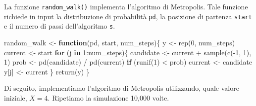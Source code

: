 \documentclass[
]{memoir}
\newenvironment{Shaded}{\begin{snugshade}}{\end{snugshade}}
\newcommand{\AttributeTok}[1]{\textcolor[rgb]{0.77,0.63,0.00}{#1}}
\newcommand{\ControlFlowTok}[1]{\textcolor[rgb]{0.13,0.29,0.53}{\textbf{#1}}}
\newcommand{\DecValTok}[1]{\textcolor[rgb]{0.00,0.00,0.81}{#1}}
\newcommand{\FloatTok}[1]{\textcolor[rgb]{0.00,0.00,0.81}{#1}}
\newcommand{\FunctionTok}[1]{\textcolor[rgb]{0.00,0.00,0.00}{#1}}
\newcommand{\NormalTok}[1]{#1}
\newcommand{\OtherTok}[1]{\textcolor[rgb]{0.56,0.35,0.01}{#1}}
\newcommand{\SpecialCharTok}[1]{\textcolor[rgb]{0.00,0.00,0.00}{#1}}
\newcommand{\StringTok}[1]{\textcolor[rgb]{0.31,0.60,0.02}{#1}}
\begin{document}
La funzione \texttt{random\_walk()} implementa l'algoritmo di Metropolis. Tale funzione richiede in input la distribuzione di probabilità \texttt{pd}, la posizione di partenza \texttt{start} e il numero di passi dell'algoritmo \texttt{s}.

\begin{Shaded}
\begin{Highlighting}[]
\NormalTok{random\_walk }\OtherTok{\textless{}{-}} \ControlFlowTok{function}\NormalTok{(pd, start, num\_steps)\{}
\NormalTok{  y }\OtherTok{\textless{}{-}} \FunctionTok{rep}\NormalTok{(}\DecValTok{0}\NormalTok{, num\_steps)}
\NormalTok{  current }\OtherTok{\textless{}{-}}\NormalTok{ start}
  \ControlFlowTok{for}\NormalTok{ (j }\ControlFlowTok{in} \DecValTok{1}\SpecialCharTok{:}\NormalTok{num\_steps)\{}
\NormalTok{    candidate }\OtherTok{\textless{}{-}}\NormalTok{ current }\SpecialCharTok{+} \FunctionTok{sample}\NormalTok{(}\FunctionTok{c}\NormalTok{(}\SpecialCharTok{{-}}\DecValTok{1}\NormalTok{, }\DecValTok{1}\NormalTok{), }\DecValTok{1}\NormalTok{)}
\NormalTok{    prob }\OtherTok{\textless{}{-}} \FunctionTok{pd}\NormalTok{(candidate) }\SpecialCharTok{/} \FunctionTok{pd}\NormalTok{(current)}
    \ControlFlowTok{if}\NormalTok{ (}\FunctionTok{runif}\NormalTok{(}\DecValTok{1}\NormalTok{) }\SpecialCharTok{\textless{}}\NormalTok{ prob)}
\NormalTok{      current }\OtherTok{\textless{}{-}}\NormalTok{ candidate}
\NormalTok{    y[j] }\OtherTok{\textless{}{-}}\NormalTok{ current}
\NormalTok{  \}}
  \FunctionTok{return}\NormalTok{(y)}
\NormalTok{\}}
\end{Highlighting}
\end{Shaded}

\noindent
Di seguito, implementiamo l'algoritmo di Metropolis utilizzando, quale valore iniziale, \(X=4\). Ripetiamo la simulazione 10,000 volte.

\begin{Shaded}
\end{Shaded}
\end{document}
